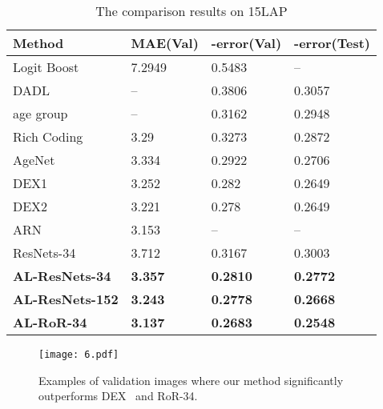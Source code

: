 \documentclass[journal]{IEEEtran}
\begin{document}
\begin{table}[!t]
\renewcommand{\arraystretch}{1.3}
\caption{The comparison results on 15LAP}
\label{tab:15LAP}
\centering
\begin{tabular}{|p{2.7cm}|p{1.4cm}|p{1.4cm}|p{1.6cm}|}
\hline
Method                            &MAE(Val)       &-error(Val)      &-error(Test)           \\ \hline\hline
Logit Boost~\cite{ref-33}                   &7.2949       &0.5483             &--         \\\hline
DADL~\cite{ref-34}                          &--           &0.3806             &0.3057      \\\hline
age group~\cite{ref-37}                     &--           &0.3162             &0.2948       \\\hline
Rich Coding~\cite{ref-40}                  &3.29         &0.3273              &0.2872        \\\hline
AgeNet~\cite{ref-42}                        &3.334        &0.2922             &0.2706         \\\hline
DEX1~\cite{ref-19}                          &3.252        &0.282              &0.2649          \\\hline
DEX2~\cite{ref-47}                          &3.221        &0.278              &0.2649           \\\hline
ARN~\cite{ref-48}                           &3.153        &--                 &--                \\\hline
ResNets-34                        &3.712        &0.3167             &0.3003             \\\hline
\textbf{AL-ResNets-34}                     &\textbf{3.357}        &\textbf{0.2810}             &\textbf{0.2772}              \\\hline
\textbf{AL-ResNets-152}                    &\textbf{3.243}       &\textbf{0.2778}             &\textbf{0.2668}               \\\hline
\textbf{AL-RoR-34}                         &\textbf{3.137}        &\textbf{0.2683}             &\textbf{0.2548}                \\\hline
\end{tabular}
\end{table}
\par
\begin{figure}[h]
\centering
\texttt{[image: 6.pdf]}
\caption{Examples of validation images where our method significantly outperforms DEX~\cite{ref-47} and RoR-34.}
\label{fig:outperforms DEX}
\end{figure}
\end{document}
